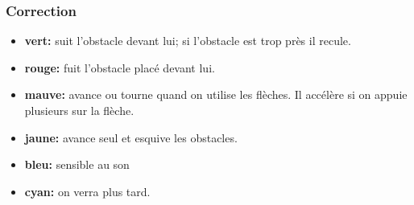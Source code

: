\documentclass[svgnames,11pt]{beamer}
\begin{document}
\begin{frame}
    \frametitle{Correction}

    \begin{itemize}
        \item \textbf{vert:} suit l'obstacle devant lui; si l'obstacle est trop près il recule.
        \item \textbf{rouge:} fuit l'obstacle placé devant lui.
        \item \textbf{mauve:} avance ou tourne quand on utilise les flèches. Il accélère si on appuie plusieurs sur la flèche.
        \item \textbf{jaune:} avance seul et esquive les obstacles.
        \item \textbf{bleu:} sensible au son
        \item \textbf{cyan:} on verra plus tard.
    \end{itemize}
    
\end{frame}
\end{document}
